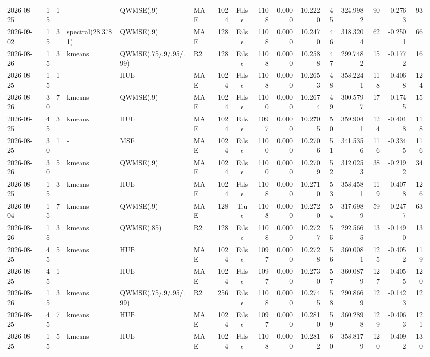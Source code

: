\documentclass[10pt]{article}
\begin{document}
\begin{landscape}
\begin{longtable}{@{}lrrlllrcrrrrrrrr@{}}
2026-08-25 & 15 & 1 & - & QWMSE(.9) & MAE & 1024 & False & 1108 & 0.0000 & 10.2220 & 45 & 324.9982 & 90 & -0.2763 & 93 \\
2026-09-02 & 15 & 3 & spectral(28.3781) & QWMSE(.9) & MAE & 128 & False & 1108 & 0.0000 & 10.2470 & 46 & 318.3204 & 62 & -0.2501 & 66 \\
2026-08-26 & 15 & 3 & kmeans & QWMSE(.75/.9/.95/.99) & R2 & 128 & False & 1108 & 0.0000 & 10.2588 & 47 & 299.7482 & 15 & -0.1772 & 16 \\
2026-08-25 & 15 & 1 & - & HUB & MAE & 1024 & False & 1108 & 0.0000 & 10.2653 & 48 & 358.2241 & 118 & -0.4068 & 124 \\
2026-08-26 & 30 & 7 & kmeans & QWMSE(.9) & MAE & 1024 & False & 1100 & 0.0000 & 10.2674 & 49 & 300.5797 & 17 & -0.1745 & 15 \\
2026-08-25 & 45 & 3 & kmeans & HUB & MAE & 1024 & False & 1097 & 0.0000 & 10.2705 & 50 & 359.9041 & 124 & -0.4048 & 118 \\
2026-08-25 & 30 & 1 & - & MSE & MAE & 1024 & False & 1100 & 0.0000 & 10.2706 & 51 & 341.5356 & 116 & -0.3345 & 116 \\
2026-08-26 & 30 & 5 & kmeans & QWMSE(.9) & MAE & 1024 & False & 1100 & 0.0000 & 10.2709 & 52 & 312.0253 & 38 & -0.2192 & 34 \\
2026-08-25 & 15 & 3 & kmeans & HUB & MAE & 1024 & False & 1108 & 0.0000 & 10.2710 & 53 & 358.4581 & 119 & -0.4078 & 126 \\
2026-09-04 & 15 & 7 & kmeans & QWMSE(.9) & MAE & 128 & True & 1108 & 0.0000 & 10.2720 & 54 & 317.6989 & 59 & -0.2477 & 63 \\
2026-08-26 & 15 & 3 & kmeans & QWMSE(.85) & R2 & 128 & False & 1108 & 0.0000 & 10.2727 & 55 & 292.5665 & 13 & -0.1490 & 13 \\
2026-08-25 & 45 & 5 & kmeans & HUB & MAE & 1024 & False & 1097 & 0.0000 & 10.2728 & 56 & 360.0081 & 125 & -0.4052 & 119 \\
2026-08-25 & 45 & 1 & - & HUB & MAE & 1024 & False & 1097 & 0.0000 & 10.2730 & 57 & 360.0879 & 127 & -0.4055 & 120 \\
2026-08-26 & 15 & 3 & kmeans & QWMSE(.75/.9/.95/.99) & R2 & 256 & False & 1108 & 0.0000 & 10.2745 & 58 & 290.8669 & 12 & -0.1423 & 12 \\
2026-08-25 & 45 & 7 & kmeans & HUB & MAE & 1024 & False & 1097 & 0.0000 & 10.2810 & 59 & 360.2898 & 129 & -0.4063 & 121 \\
2026-08-25 & 15 & 5 & kmeans & HUB & MAE & 1024 & False & 1108 & 0.0000 & 10.2812 & 60 & 358.8179 & 120 & -0.4092 & 130 \\

\end{longtable}
\end{landscape}
\end{document}
